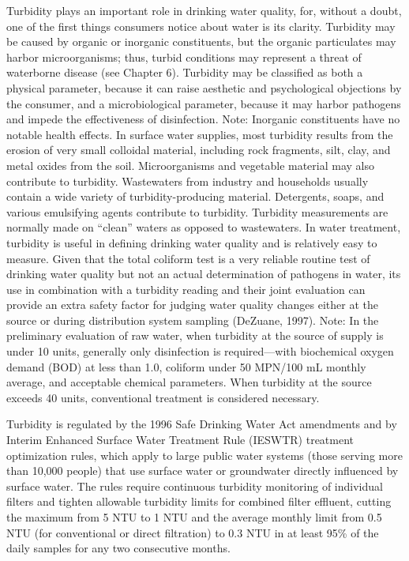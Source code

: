 \documentclass{article}
\begin{document}
Turbidity plays an important role in drinking water quality, for,
without a doubt, one of the first things consumers notice about water is
its clarity. Turbidity may be caused by organic or inorganic
constituents, but the organic particulates may harbor microorganisms;
thus, turbid conditions may represent a threat of waterborne disease
(see Chapter 6). Turbidity may be classified as both a physical
parameter, because it can raise aesthetic and psychological objections
by the consumer, and a microbiological parameter, because it may harbor
pathogens and impede the effectiveness of disinfection. Note: Inorganic
constituents have no notable health effects. In surface water supplies,
most turbidity results from the erosion of very small colloidal
material, including rock fragments, silt, clay, and metal oxides from
the soil. Microorganisms and vegetable material may also contribute to
turbidity. Wastewaters from industry and households usually contain a
wide variety of turbidity-producing material. Detergents, soaps, and
various emulsifying agents contribute to turbidity. Turbidity
measurements are normally made on ``clean'' waters as opposed to
wastewaters. In water treatment, turbidity is useful in defining
drinking water quality and is relatively easy to measure. Given that the
total coliform test is a very reliable routine test of drinking water
quality but not an actual determination of pathogens in water, its use
in combination with a turbidity reading and their joint evaluation can
provide an extra safety factor for judging water quality changes either
at the source or during distribution system sampling (DeZuane, 1997).
Note: In the preliminary evaluation of raw water, when turbidity at the
source of supply is under 10 units, generally only disinfection is
required---with biochemical oxygen demand (BOD) at less than 1.0,
coliform under 50 MPN/100 mL monthly average, and acceptable chemical
parameters. When turbidity at the source exceeds 40 units, conventional
treatment is considered necessary.

Turbidity is regulated by the 1996 Safe Drinking Water Act amendments
and by Interim Enhanced Surface Water Treatment Rule (IESWTR) treatment
optimization rules, which apply to large public water systems (those
serving more than 10,000 people) that use surface water or groundwater
directly influenced by surface water. The rules require continuous
turbidity monitoring of individual filters and tighten allowable
turbidity limits for combined filter effluent, cutting the maximum from
5 NTU to 1 NTU and the average monthly limit from 0.5 NTU (for
conventional or direct filtration) to 0.3 NTU in at least 95\% of the
daily samples for any two consecutive months.
\end{document}

